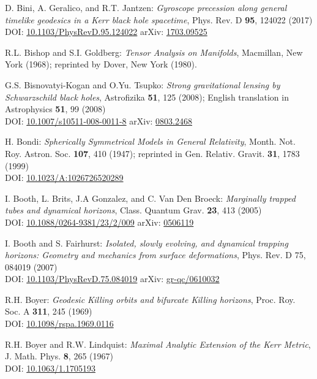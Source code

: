 \begin{thebibliography}{123}
D. Bini, A. Geralico, and R.T. Jantzen:
{\em Gyroscope precession along general timelike geodesics in a Kerr black hole spacetime},
Phys. Rev. D {\bf 95}, 124022 (2017)\\
DOI: \href{https://doi.org/10.1103/PhysRevD.95.124022}{10.1103/PhysRevD.95.124022}\hfill
arXiv: \href{https://arxiv.org/abs/1703.09525}{1703.09525}

R.L. Bishop and S.I. Goldberg:
{\em Tensor Analysis on Manifolds},
Macmillan, New York (1968); reprinted by Dover, New York (1980).

G.S. Bisnovatyi-Kogan and O.Yu. Tsupko:
{\em Strong gravitational lensing by Schwarzschild black holes},
Astrofizika {\bf 51}, 125 (2008); English translation in
Astrophysics {\bf 51}, 99 (2008)\\
DOI: \href{https://doi.org/10.1007/s10511-008-0011-8}{10.1007/s10511-008-0011-8}\hfill
arXiv: \href{https://arxiv.org/abs/0803.2468}{0803.2468}

H. Bondi:
{\em Spherically Symmetrical Models in General Relativity},
Month. Not. Roy. Astron. Soc. {\bf 107}, 410 (1947);
reprinted in
Gen. Relativ. Gravit. {\bf 31}, 1783 (1999)\\
DOI: \href{https://doi.org/10.1023/A:1026726520289}{10.1023/A:1026726520289}

I. Booth, L. Brits, J.A Gonzalez, and C. Van Den Broeck:
{\em Marginally trapped tubes and dynamical horizons},
Class. Quantum Grav. {\bf 23}, 413 (2005)\\
DOI: \href{https://doi.org/10.1088/0264-9381/23/2/009}{10.1088/0264-9381/23/2/009}\hfill
arXiv: \href{https://arxiv.org/abs/gr-qc/0506119}{0506119}

I. Booth and S. Fairhurst:
{\em Isolated, slowly evolving, and dynamical trapping horizons: Geometry and mechanics from surface deformations},
Phys. Rev. D 75, 084019 (2007)\\
DOI: \href{https://doi.org/10.1103/PhysRevD.75.084019}{10.1103/PhysRevD.75.084019}\hfill
arXiv: \href{https://arxiv.org/abs/gr-qc/0610032}{gr-qc/0610032}

R.H. Boyer: {\em Geodesic Killing orbits and bifurcate Killing horizons},
Proc. Roy. Soc. A {\bf 311}, 245 (1969)\\
DOI: \href{https://doi.org/10.1098/rspa.1969.0116}{10.1098/rspa.1969.0116}

R.H. Boyer and R.W. Lindquist: {\em Maximal Analytic Extension of the Kerr Metric},
J. Math. Phys. {\bf 8}, 265 (1967)\\
DOI: \href{https://doi.org/10.1063/1.1705193}{10.1063/1.1705193}


\end{thebibliography}
